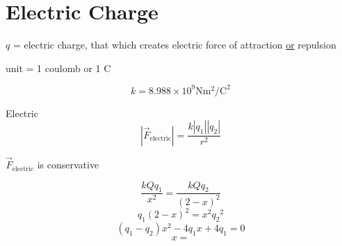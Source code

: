 \documentclass[fleqn]{article}
\begin{document}
\setlength{\mathindent}{0pt}
\section*{Electric Charge}
$q$ = electric charge, that which creates electric force of attraction \underline{or} repulsion

unit = 1 coulomb or 1 C

\[ k = 8.988 \times 10^{9} \text{N}  \text{m}^2/\text{C}^2   \]

Electric
\[ |\vec{F}_{\text{electric} } | = \frac{k|q_1||q_2|}{r^2} \]

$\vec{F}_ \text{electric}$ is conservative

\[ \frac{kQq_1}{x^2} = \frac{kQq_2}{(2-x)^2} \]
\[ q_1(2-x)^2=x^2{q_2}^2 \]
\[ (q_1-q_2)x^2 - 4q_1x + 4q_1 = 0 \]
\[ x =  \]
\end{document}
